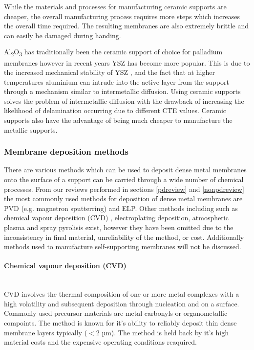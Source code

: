 While the materials and processes for manufacturing ceramic supports are cheaper, the overall manufacturing process requires more steps which increases the overall time required. The resulting membranes are also extremely brittle and can easily be damaged during handing. 

Al\textsubscript{2}O\textsubscript{3} has traditionally been the ceramic support of choice for palladium membranes however in recent years YSZ has become more popular. This is due to the increased mechanical stability of YSZ \cite{Hayashi2005}, and the fact that at higher temperatures aluminium can intrude into the active layer from the support through a mechanism similar to intermetallic diffusion.\cite{Atsonios2015} Using ceramic supports solves the problem of intermetallic diffusion with the drawback of increasing the likelihood of delamination occurring due to different CTE values. Ceramic supports also have the advantage of being much cheaper to manufacture the metallic supports. \cite{Atsonios2015}

\subsubsection{Membrane deposition methods}
There are various methods which can be used to deposit dense metal membranes onto the surface of a support can be carried through a wide number of chemical processes. From our reviews performed in sections \ref{pdreview} and \ref{nonpdreview} the most commonly used methods for deposition of dense metal membranes are PVD (e.g. magnetron sputterring) and ELP. Other methods including such as chemical vapour deposition (CVD) \cite{Yun2011a, Wang2006a, David2011a}, electroplating deposition, atmospheric plasma \cite{HUANG2007160} and spray pyrolisis \cite{LI1993247} exist, however they have been omitted due to the inconsistency in final material, unreliability of the method, or cost. Additionally methods used to manufacture self-supporting membranes will not be discussed.

\paragraph*{Chemical vapour deposition (CVD)}\\
CVD involves the thermal composition of one or more metal complexes with a high volatility and subsequent deposition through nucleation and on a surface. Commonly used precursor materials are metal carbonyls or organometallic compoints. The method is known for it's ability to reliably deposit thin dense membrane layers typically ($<$2 µm). The method is held back by it's high material costs and the expensive operating conditions reaquired.\cite{Yun2011a, Basile2008} 

